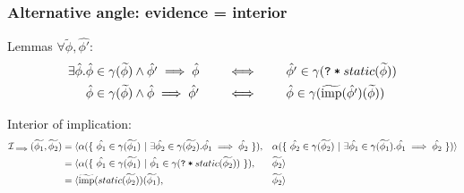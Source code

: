 \documentclass[11pt,a4paper]{article}
\newcommand{\ttt}{\texttt}
\newcommand{\grad}[1]{\widetilde{#1}}
\newcommand{\qm}{\ttt{?}}
\newcommand{\withqm}[1]{\ttt{\qm\:*\:$#1$}}
\newcommand{\imp}{\textrm{imp}}
\begin{document}

\subsubsection{Alternative angle: evidence = interior}
Lemmas $\forall \grad{\phi}, \hat{\phi'}$:
\begin{align*}
\exists \hat{\phi}. 
&\hat{\phi} \in \gamma(\grad{\phi}) \wedge \hat{\phi'} \implies \hat{\phi}
\quad\quad
\iff
\quad\quad
\hat{\phi'} \in \gamma(\withqm{static(\grad{\phi})})\\
&\hat{\phi} \in \gamma(\grad{\phi}) \wedge \hat{\phi} \implies \hat{\phi'}
\quad\quad
\iff
\quad\quad
\hat{\phi} \in \gamma(\grad{\imp}(\hat{\phi'})(\grad{\phi}))\\
\end{align*}


Interior of implication:
\begin{align*}
\mathcal{I}_{\implies}(\grad{\phi_1}, \grad{\phi_2})
= \langle 
    &\alpha(\{~ \hat{\phi_1} \in \gamma(\grad{\phi_1}) ~|~ \exists \hat{\phi_2} \in \gamma(\grad{\phi_2}). \hat{\phi_1} \implies \hat{\phi_2} ~\}),
    &&\alpha(\{~ \hat{\phi_2} \in \gamma(\grad{\phi_2}) ~|~ \exists \hat{\phi_1} \in \gamma(\grad{\phi_1}). \hat{\phi_1} \implies \hat{\phi_2} ~\}) 
\rangle\\
= \langle 
    &\alpha(\{~ \hat{\phi_1} \in \gamma(\grad{\phi_1}) ~|~ \hat{\phi_1} \in \gamma(\withqm{static(\grad{\phi_2})}) ~\}),
    &&\grad{\phi_2} 
\rangle\\
= \langle 
    &\grad{\imp}(static(\grad{\phi_2}))(\grad{\phi_1}),
    &&\grad{\phi_2} 
\rangle\\
\end{align*}
\end{document}
